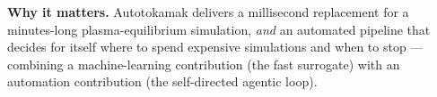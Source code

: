 \documentclass[10pt]{article}
\begin{document}
\vspace{3pt}
\noindent\textbf{Why it matters.} Autotokamak delivers a millisecond replacement for a
minutes-long plasma-equilibrium simulation, \emph{and} an automated pipeline that decides for
itself where to spend expensive simulations and when to stop --- combining a machine-learning
contribution (the fast surrogate) with an automation contribution (the self-directed agentic loop).
\end{document}

